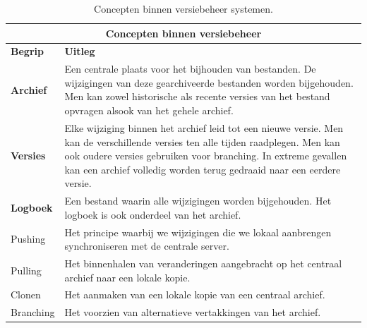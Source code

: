 \begin{table}[h!]
	\centering
	\begin{tabular}{ |p{2cm}|p{12cm}|}
 		\hline
 		\multicolumn{2}{|c|}{\large \textbf{Concepten binnen versiebeheer}} \\
 		\hline
 		\textbf{Begrip}	& \textbf{Uitleg}\\
 		\hline
 		\textbf{Archief} & Een centrale plaats voor het bijhouden van bestanden. De wijzigingen van deze gearchiveerde bestanden worden bijgehouden. Men kan zowel historische als recente versies van het bestand opvragen alsook van het gehele archief.\\
 		\hline
 		\textbf{Versies} & Elke wijziging binnen het archief leid tot een nieuwe versie. Men kan de verschillende versies ten alle tijden raadplegen. Men kan ook oudere versies gebruiken voor branching. In extreme gevallen kan een archief volledig worden terug gedraaid naar een eerdere versie.\\
 		\hline
		\textbf{Logboek} & Een bestand waarin alle wijzigingen worden bijgehouden. Het logboek is ook onderdeel van het archief. \\
		\hline
		Pushing	& Het principe waarbij we wijzigingen die we lokaal aanbrengen synchroniseren met de centrale server.\\
		\hline
		Pulling & Het binnenhalen van veranderingen aangebracht op het centraal archief naar een lokale kopie.\\
		\hline
		Clonen & Het aanmaken van een lokale kopie van een centraal archief. \\
		Branching & Het voorzien van alternatieve vertakkingen van het archief. \\
		\hline
	\end{tabular}
	\label{tbl_concepts}
	\caption{Concepten binnen versiebeheer systemen.}
\end{table}